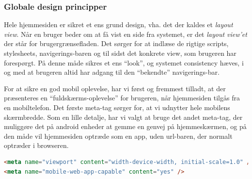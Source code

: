 \subsubsection{Globale design principper}
Hele hjemmesiden er sikret et ens grund design, vha. det der kaldes et \textit{layout view}.
Når en bruger beder om at få vist en side fra systemet, er det \textit{layout view'et} der står for brugergrænsefladen.
Det sørger for at indlæse de rigtige scripts, stylesheets, navigerings-baren og til sidst det konkrete view, som brugeren har forespørgt.
På denne måde sikres et ens ``look'', og systemet consistency hæves, i og med at brugeren altid har adgang til den ``bekendte'' navigerings-bar.

For at sikre en god mobil oplevelse, har vi først og fremmest tilladt, at der præsenteres en ``fuldskærms-oplevelse'' for brugeren, når hjemmesiden tilgås fra en mobiltelefon.
Det første meta-tag sørger for, at vi udnytter hele mobilens skærmbredde.
Som en lille detalje, har vi valgt at bruge det andet meta-tag, der muliggøre det på android enheder at gemme en genvej på hjemmeskærmen, og på den måde vil hjemmesiden optræde som en app, uden url-baren, der normalt optræder i browseren.
\begin{lstlisting}[language=HTML]
<meta name="viewport" content="width-device-width, initial-scale=1.0" />
<meta name="mobile-web-app-capable" content="yes" />
\end{lstlisting}

